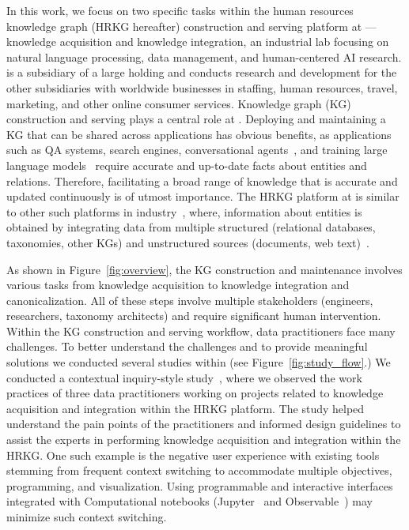 In this work, we focus on two specific tasks within the human resources knowledge graph (HRKG hereafter) construction and serving platform at \company --- knowledge acquisition and knowledge integration, an industrial lab focusing on natural language processing, data management, and human-centered AI research. 
\company is a subsidiary of a large holding and conducts research and development for the other subsidiaries with worldwide businesses in staffing, human resources, travel, marketing, and other online consumer services.
Knowledge graph (KG) construction and serving plays a central role at \company. 
Deploying and maintaining a KG that can be shared across 
applications has obvious benefits, as applications such as QA systems, search engines, 
conversational agents~\cite{quamar2020ontology}, and training large language models~\cite{zhao2021knowledge}
require accurate and up-to-date facts about entities and relations. 
Therefore, facilitating a broad range of knowledge that is accurate
and updated continuously is of utmost importance. The HRKG platform
at \company is similar to other such platforms
in industry~\cite{ilyas2022saga, bharadwaj2017creation, knowledgevault, haase2019metaphactory},
where, information about entities is obtained by integrating data from multiple 
structured (\eg relational databases, taxonomies, other KGs) and unstructured sources (\eg documents, web text)~\cite{chen2020kgpt}.


As shown in Figure~\ref{fig:overview}, the KG construction and maintenance involves various tasks from knowledge acquisition to
knowledge integration and canonicalization.
All of these steps involve multiple stakeholders (\eg engineers, researchers, taxonomy architects)
and require significant human intervention. 
Within the KG construction and serving workflow, data practitioners face many challenges. To better understand the challenges and to provide meaningful solutions we conducted several studies within \company (see Figure~\ref{fig:study_flow}.)
We conducted a contextual inquiry-style study~\cite{holtzblatt1997contextual}, where we observed the work practices of three data practitioners working on projects related to knowledge acquisition and integration within the HRKG platform. The study helped understand the pain points of the practitioners and informed design guidelines to assist the experts in performing knowledge acquisition and integration within the HRKG. One such example is the negative user experience with existing tools stemming from frequent context switching to accommodate multiple objectives, \eg programming, and visualization. Using programmable and interactive interfaces integrated with Computational notebooks (\eg Jupyter~\cite{kluyver2016jupyter} and Observable~\cite{observable}) may minimize such context switching.

